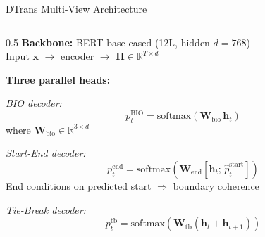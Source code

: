 \documentclass[aspectratio=169,10pt]{beamer}
\begin{document}
\begin{frame}{DTrans Multi-View Architecture}
  \begin{columns}[T]
    \begin{column}{0.5\textwidth}
      \textbf{Backbone:} BERT-base-cased (12L, hidden $d=768$)\\
      Input $\mathbf{x}$ $\to$ encoder $\to$ $\mathbf{H} \in \mathbb{R}^{T \times d}$

      \vspace{0.6em}
      \textbf{Three parallel heads:}

      \textit{BIO decoder:}
      \[
        p^{\text{BIO}}_t = \mathrm{softmax}(\mathbf{W}_{\text{bio}}\,\mathbf{h}_t)
      \]
      where $\mathbf{W}_{\text{bio}} \in \mathbb{R}^{3 \times d}$

      \textit{Start-End decoder:}
      \[
        p^{\text{end}}_t = \mathrm{softmax}(\mathbf{W}_{\text{end}}[\mathbf{h}_t;\,\hat{p}^{\text{start}}_t])
      \]
      End conditions on predicted start $\Rightarrow$ boundary coherence

      \textit{Tie-Break decoder:}
      \[
        p^{\text{tb}}_t = \mathrm{softmax}(\mathbf{W}_{\text{tb}}(\mathbf{h}_t + \mathbf{h}_{t+1}))
      \]


\end{column}
\end{columns}
\end{frame}
\end{document}
